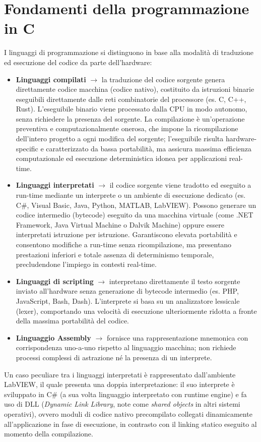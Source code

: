 \chapter{Fondamenti della programmazione in C}
I linguaggi di programmazione si distinguono in base alla modalità di traduzione ed esecuzione del codice da parte dell'hardware:
\begin{itemize}
    \item \textbf{Linguaggi compilati} $\rightarrow$ la traduzione del codice sorgente genera direttamente codice macchina (codice nativo), costituito da istruzioni binarie eseguibili direttamente dalle reti combinatorie del processore (es. C, C++, Rust). L'eseguibile binario viene processato dalla CPU in modo autonomo, senza richiedere la presenza del sorgente. La compilazione è un'operazione preventiva e computazionalmente onerosa, che impone la ricompilazione dell'intero progetto a ogni modifica del sorgente; l'eseguibile risulta hardware-specific e caratterizzato da bassa portabilità, ma assicura massima efficienza computazionale ed esecuzione deterministica idonea per applicazioni real-time.
    \item \textbf{Linguaggi interpretati} $\rightarrow$ il codice sorgente viene tradotto ed eseguito a run-time mediante un interprete o un ambiente di esecuzione dedicato (es. C\#, Visual Basic, Java, Python, MATLAB, LabVIEW). Possono generare un codice intermedio (bytecode) eseguito da una macchina virtuale (come .NET Framework, Java Virtual Machine o Dalvik Machine) oppure essere interpretati istruzione per istruzione. Garantiscono elevata portabilità e consentono modifiche a run-time senza ricompilazione, ma presentano prestazioni inferiori e totale assenza di determinismo temporale, precludendone l'impiego in contesti real-time.
    \item \textbf{Linguaggi di scripting} $\rightarrow$ interpretano direttamente il testo sorgente inviato all'hardware senza generazione di bytecode intermedio (es. PHP, JavaScript, Bash, Dash). L'interprete si basa su un analizzatore lessicale (lexer), comportando una velocità di esecuzione ulteriormente ridotta a fronte della massima portabilità del codice.
    \item \textbf{Linguaggio Assembly} $\rightarrow$ fornisce una rappresentazione mnemonica con corrispondenza uno-a-uno rispetto al linguaggio macchina; non richiede processi complessi di astrazione né la presenza di un interprete.
\end{itemize}
Un caso peculiare tra i linguaggi interpretati è rappresentato dall'ambiente LabVIEW, il quale presenta una doppia interpretazione: il suo interprete è sviluppato in C\# (a sua volta linguaggio interpretato con runtime engine) e fa uso di DLL (\textit{Dynamic Link Library}, note come \textit{shared objects} in altri sistemi operativi), ovvero moduli di codice nativo precompilato collegati dinamicamente all'applicazione in fase di esecuzione, in contrasto con il linking statico eseguito al momento della compilazione.


